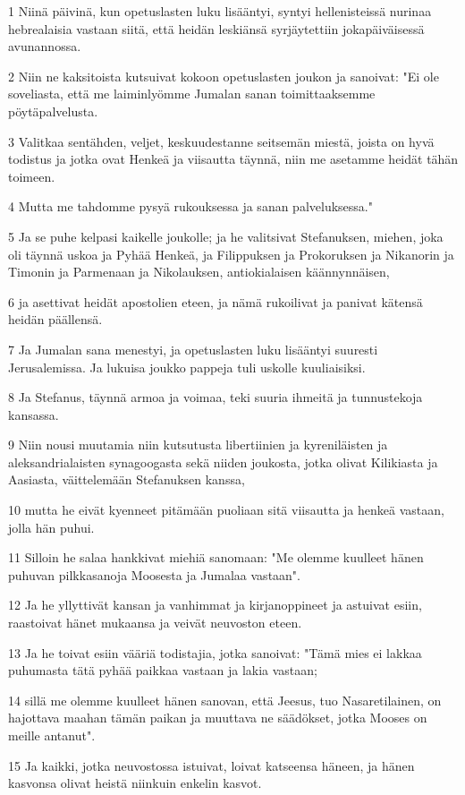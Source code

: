 \par 1 Niinä päivinä, kun opetuslasten luku lisääntyi, syntyi hellenisteissä nurinaa hebrealaisia vastaan siitä, että heidän leskiänsä syrjäytettiin jokapäiväisessä avunannossa.
\par 2 Niin ne kaksitoista kutsuivat kokoon opetuslasten joukon ja sanoivat: "Ei ole soveliasta, että me laiminlyömme Jumalan sanan toimittaaksemme pöytäpalvelusta.
\par 3 Valitkaa sentähden, veljet, keskuudestanne seitsemän miestä, joista on hyvä todistus ja jotka ovat Henkeä ja viisautta täynnä, niin me asetamme heidät tähän toimeen.
\par 4 Mutta me tahdomme pysyä rukouksessa ja sanan palveluksessa."
\par 5 Ja se puhe kelpasi kaikelle joukolle; ja he valitsivat Stefanuksen, miehen, joka oli täynnä uskoa ja Pyhää Henkeä, ja Filippuksen ja Prokoruksen ja Nikanorin ja Timonin ja Parmenaan ja Nikolauksen, antiokialaisen käännynnäisen,
\par 6 ja asettivat heidät apostolien eteen, ja nämä rukoilivat ja panivat kätensä heidän päällensä.
\par 7 Ja Jumalan sana menestyi, ja opetuslasten luku lisääntyi suuresti Jerusalemissa. Ja lukuisa joukko pappeja tuli uskolle kuuliaisiksi.
\par 8 Ja Stefanus, täynnä armoa ja voimaa, teki suuria ihmeitä ja tunnustekoja kansassa.
\par 9 Niin nousi muutamia niin kutsutusta libertiinien ja kyreniläisten ja aleksandrialaisten synagoogasta sekä niiden joukosta, jotka olivat Kilikiasta ja Aasiasta, väittelemään Stefanuksen kanssa,
\par 10 mutta he eivät kyenneet pitämään puoliaan sitä viisautta ja henkeä vastaan, jolla hän puhui.
\par 11 Silloin he salaa hankkivat miehiä sanomaan: "Me olemme kuulleet hänen puhuvan pilkkasanoja Moosesta ja Jumalaa vastaan".
\par 12 Ja he yllyttivät kansan ja vanhimmat ja kirjanoppineet ja astuivat esiin, raastoivat hänet mukaansa ja veivät neuvoston eteen.
\par 13 Ja he toivat esiin vääriä todistajia, jotka sanoivat: "Tämä mies ei lakkaa puhumasta tätä pyhää paikkaa vastaan ja lakia vastaan;
\par 14 sillä me olemme kuulleet hänen sanovan, että Jeesus, tuo Nasaretilainen, on hajottava maahan tämän paikan ja muuttava ne säädökset, jotka Mooses on meille antanut".
\par 15 Ja kaikki, jotka neuvostossa istuivat, loivat katseensa häneen, ja hänen kasvonsa olivat heistä niinkuin enkelin kasvot.

